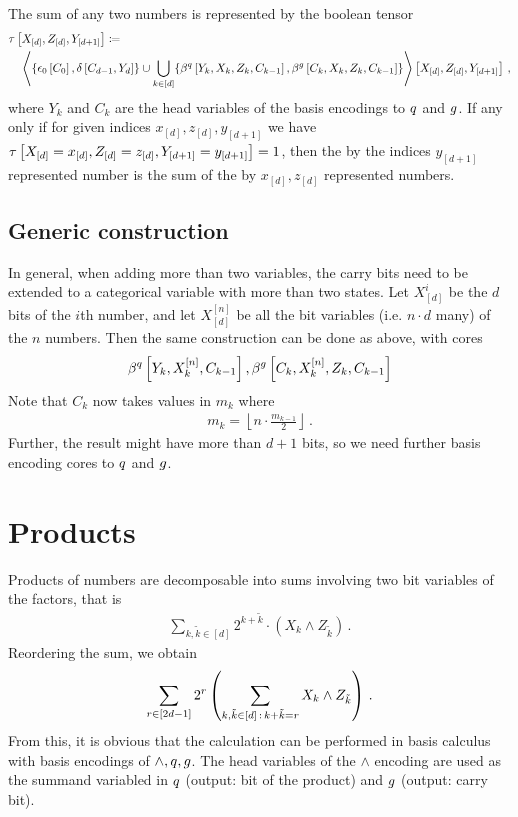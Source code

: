 \documentclass[aps,onecolumn,nofootinbib,pra]{article}
\begin{document}
    The sum of any two numbers is represented by the boolean tensor
    \begin{align*}
        &\tau\left[X_{[d]},Z_{[d]},Y_{[d+1]}\right]
        \coloneqq \\
        & \quad \left\langle \{\epsilon_{0}\left[C_0\right],\delta\left[C_{d-1},Y_{d}\right]\} \cup
            \bigcup_{k\in[d]}\{
            \beta^{q}\left[Y_{k},X_{k},Z_{k},C_{k-1}\right],
            \beta^{g}\left[C_{k},X_{k},Z_{k},C_{k-1}\right] \}
        \right\rangle \left[ X_{[d]},Z_{[d]},Y_{[d+1]} \right] \, ,
    \end{align*}
    where $Y_k$ and $C_k$ are the head variables of the basis encodings to $q$ and $g$.
    If any only if for given indices $x_{[d]},z_{[d]},y_{[d+1]}$ we have $\tau\left[X_{[d]}=x_{[d]},Z_{[d]}=z_{[d]},Y_{[d+1]}=y_{[d+1]}\right]=1$, then the by the indices $y_{[d+1]}$ represented number is the sum of the by $x_{[d]},z_{[d]}$ represented numbers.

    \subsection{Generic construction}

    In general, when adding more than two variables, the carry bits need to be extended to a categorical variable with more than two states.
    Let $X^i_{[d]}$ be the $d$ bits of the $i$th number, and let $X^{[n]}_{[d]}$ be all the bit variables (i.e. $n\cdot d$ many) of the $n$ numbers.
    Then the same construction can be done as above, with cores
    \begin{align*}
        \beta^{q}\left[Y_{k},X^{[n]}_{k},C_{k-1}\right],
        \beta^{g}\left[C_{k},X^{[n]}_{k},Z_{k},C_{k-1}\right]
    \end{align*}
    Note that $C_k$ now takes values in $m_k$ where
    \begin{align*}
        m_k = \left\lfloor n \cdot \frac{m_{k-1}}{2}\right\rfloor \, .
    \end{align*}
    Further, the result might have more than $d+1$ bits, so we need further basis encoding cores to $q$ and $g$.

    \section{Products}

    Products of numbers are decomposable into sums involving two bit variables of the factors, that is
    \begin{align*}
        \sum_{k,\tilde{k} \in [d]} 2^{k+\tilde{k}} \cdot (X_k \land Z_{\tilde{k}}) \, .
    \end{align*}
    Reordering the sum, we obtain
    \begin{align*}
       \sum_{r\in[2d-1]} 2^{r} \left(\sum_{k,\tilde{k} \in [d] \,:\, k +\tilde{k}=r}  X_k \land Z_{\tilde{k}} \right) \, .
    \end{align*}
    From this, it is obvious that the calculation can be performed in basis calculus with basis encodings of $\land,q,g$.
    The head variables of the $\land$ encoding are used as the summand variabled in $q$ (output: bit of the product) and $g$ (output: carry bit).
\end{document}
